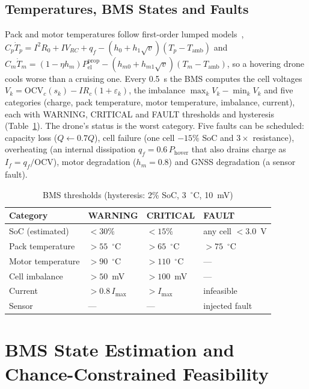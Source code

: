 \documentclass[journal]{IEEEtran}
\begin{document}
\subsection{Temperatures, BMS States and Faults}
Pack and motor temperatures follow first-order lumped models~\cite{bernardi1985energy}, $C_p \dot T_p = I^2 R_0 + I V_{RC} + q_f - (h_0 + h_1\sqrt{v})(T_p - T_{\mathrm{amb}})$ and $C_m \dot T_m = (1 - \eta h_m)P_{\mathrm{el}}^{\mathrm{prop}} - (h_{m0} + h_{m1}\sqrt{v})(T_m - T_{\mathrm{amb}})$, so a hovering drone cools worse than a cruising one. Every 0.5~s the BMS computes the cell voltages $V_k = \mathrm{OCV}_c(s_k) - I R_c (1 + \varepsilon_k)$, the imbalance $\max_k V_k - \min_k V_k$ and five categories (charge, pack temperature, motor temperature, imbalance, current), each with WARNING, CRITICAL and FAULT thresholds and hysteresis (Table~\ref{tab:bms}). The drone's status is the worst category. Five faults can be scheduled: capacity loss ($Q \leftarrow 0.7Q$), cell failure (one cell $-15\%$ SoC and $3\times$ resistance), overheating (an internal dissipation $q_f = 0.6\,P_{\mathrm{hover}}$ that also drains charge as $I_f = q_f/\mathrm{OCV}$), motor degradation ($h_m = 0.8$) and GNSS degradation (a sensor fault).

\begin{table}[t]
\centering
\caption{BMS thresholds (hysteresis: 2\% SoC, 3~$^\circ$C, 10~mV)}
\label{tab:bms}
\footnotesize
\setlength{\tabcolsep}{3pt}
\begin{tabular}{@{}llll@{}}
\toprule
Category & WARNING & CRITICAL & FAULT \\
\midrule
SoC (estimated) & $<30\%$ & $<15\%$ & any cell $<3.0$~V \\
Pack temperature & $>55$~$^\circ$C & $>65$~$^\circ$C & $>75$~$^\circ$C \\
Motor temperature & $>90$~$^\circ$C & $>110$~$^\circ$C & --- \\
Cell imbalance & $>50$~mV & $>100$~mV & --- \\
Current & $>0.8\,I_{\max}$ & $>I_{\max}$ & infeasible \\
Sensor & --- & --- & injected fault \\
\bottomrule
\end{tabular}
\end{table}

\section{BMS State Estimation and Chance-Constrained Feasibility}\label{sec:estimation}
\end{document}
